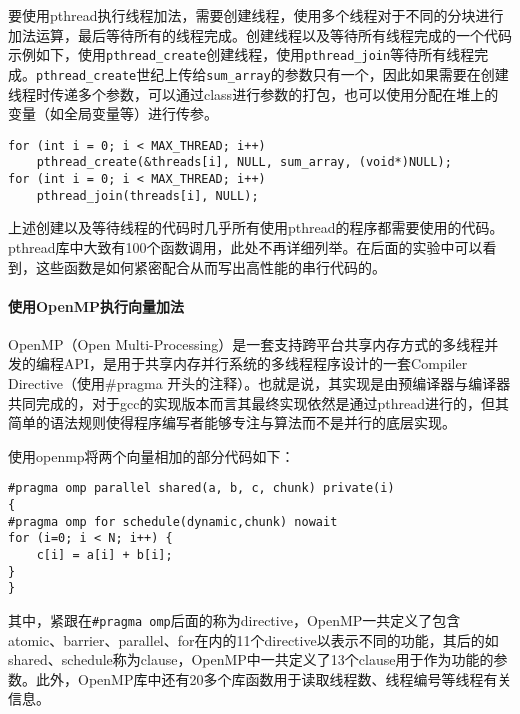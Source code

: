 \par 要使用pthread执行线程加法，需要创建线程，使用多个线程对于不同的分块进行加法运算，最后等待所有的线程完成。创建线程以及等待所有线程完成的一个代码示例如下，使用\lstinline{pthread_create}创建线程，使用\lstinline{pthread_join}等待所有线程完成。\lstinline{pthread_create}世纪上传给\lstinline{sum_array}的参数只有一个，因此如果需要在创建线程时传递多个参数，可以通过class进行参数的打包，也可以使用分配在堆上的变量（如全局变量等）进行传参。

\begin{lstlisting}
for (int i = 0; i < MAX_THREAD; i++)
    pthread_create(&threads[i], NULL, sum_array, (void*)NULL);
for (int i = 0; i < MAX_THREAD; i++)
    pthread_join(threads[i], NULL);
\end{lstlisting}
\par 上述创建以及等待线程的代码时几乎所有使用pthread的程序都需要使用的代码。pthread库中大致有100个函数调用，此处不再详细列举。在后面的实验中可以看到，这些函数是如何紧密配合从而写出高性能的串行代码的。

\paragraph{使用OpenMP执行向量加法}
\label{par:shi_yong_openmpzhi_xing_xiang_liang_jia_fa_}
\par OpenMP（Open Multi-Processing）是一套支持跨平台共享内存方式的多线程并发的编程API，是用于共享内存并行系统的多线程程序设计的一套Compiler Directive（使用\#pragma 开头的注释）。也就是说，其实现是由预编译器与编译器共同完成的，对于gcc的实现版本而言其最终实现依然是通过pthread进行的，但其简单的语法规则使得程序编写者能够专注与算法而不是并行的底层实现。
\par 使用openmp将两个向量相加的部分代码如下：

\begin{lstlisting}
#pragma omp parallel shared(a, b, c, chunk) private(i)
{
#pragma omp for schedule(dynamic,chunk) nowait
for (i=0; i < N; i++) {
    c[i] = a[i] + b[i];
}
}
\end{lstlisting}
\par 其中，紧跟在\lstinline{#pragma omp}后面的称为directive，OpenMP一共定义了包含atomic、barrier、parallel、for在内的11个directive以表示不同的功能，其后的如shared、schedule称为clause，OpenMP中一共定义了13个clause用于作为功能的参数。此外，OpenMP库中还有20多个库函数用于读取线程数、线程编号等线程有关信息。

